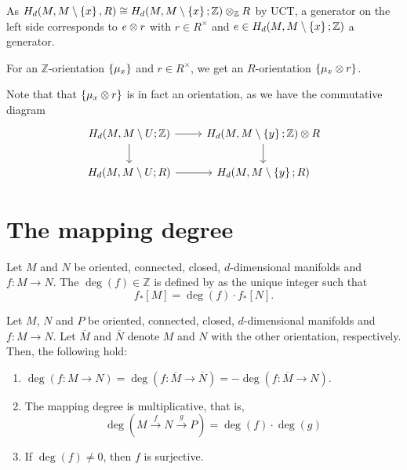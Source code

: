 


\begin{remark}
  As
  $H_d(M, M \setminus \left\{  x  \right\} ,R)
  \cong
  H_d(M, M \setminus \left\{  x  \right\} ; \mathbb{Z}) \otimes _{\mathbb{Z}} R$
  by UCT,
  a generator on the left side corresponds to
  $e\otimes r$ with $r\in R^{\times}$ and
  $e\in H_d(M, M \setminus \left\{  x  \right\} ; \mathbb{Z})$
  a generator.

  For an $\mathbb{Z}$-orientation $\left\{  \mu_x  \right\} $ and $r\in R^{\times}$,
  we get an $R$-orientation  $\left\{  \mu_x \otimes r \right\} $.

  Note that that $\left\{  \mu_x \otimes r  \right\} $ is in fact an orientation,
  as we have the commutative diagram
  \[
  \begin{tikzcd}
    H_d(M, M \setminus U; \mathbb{Z}) \ar[swap]{d}{} \ar{r}{} & H_d(M, M\setminus \set{ y } ; \mathbb{Z}) \tensor R \ar{d}{} \\
    H_d(M , M \setminus U; R) \ar[swap]{r}{} & H_d(M, M\setminus \set{ y } ; R)
  \end{tikzcd}
  \]
\end{remark}




\section{The mapping degree}

\begin{definition}
  \label{def:mapping-degree-oriented-closed-connected-manifolds}
  Let $M$ and $N$ be oriented, connected, closed,
  $d$-dimensional manifolds and $f\colon M\to N$.
  The  $\deg(f)\in \mathbb{Z}$
  is defined by as the unique integer such that
  \[
    f_*[M] = \deg(f)\cdot f_*[N]
  .\] 
\end{definition}


\begin{lemma}
  Let $M$, $N$ and $P$ be oriented, connected, closed,
  $d$-dimensional manifolds and $f\colon M\to N$.
  Let $\overline{M}$ and $\overline{N}$ denote $M$ and $N$
  with the other orientation, respectively.
  Then, the following hold:
  \begin{enumerate}[h]
    \item $\deg(f\colon M\to N) = \deg(f\colon \overline{M}\to \overline{N}) = -\deg(f\colon \overline{M}\to N)$.
    \item The mapping degree is multiplicative,
      that is,
      \[
        \deg(M\xrightarrow{f} N\xrightarrow{g} P)
        =
        \deg(f)\cdot \deg(g)
      \]
    \item If $\deg(f) \neq 0$, then $f$ is surjective.
  \end{enumerate}
\end{lemma}

